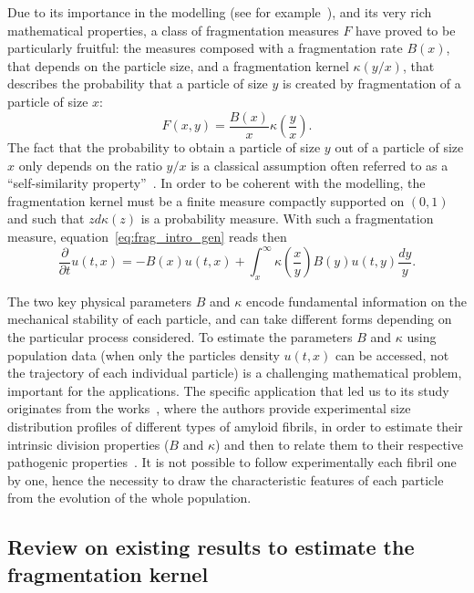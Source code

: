 \documentclass[AHL,Unicode,longabstracts,published]{cedram}
\newcommand*\dst{\displaystyle}
\newcommand*\p{\partial}
\newcommand*\f{\frac}
\begin{document}
Due to its importance in the modelling (see for example~\cite{Ram74,Val}), and its very rich mathematical properties, a class of fragmentation measures $F$ have proved to be particularly fruitful:
the measures composed with a fragmentation rate $B(x)$, that depends on the particle size, and a fragmentation kernel $\kappa (y/x)$, that describes the probability that a particle of size $y$ is created by fragmentation of a particle of size $x$:
\begin{equation}\label{eq:frag_intro_simF}
F(x, y)= \frac {B(x)} {x}\kappa\left(\frac {y} {x} \right).
\end{equation}
The fact that the probability to obtain a particle of size $y$ out of a particle of size $x$ only depends on the ratio $y/x$ is a classical assumption often referred to as a ``self-similarity property''~\cite{Bertoin1,BW,CCM}. In order to be coherent with the modelling, the fragmentation kernel must be a finite measure compactly supported on $(0, 1)$ and such that $zd\kappa(z)$ is a probability measure. With such a fragmentation measure, equation~\eqref{eq:frag_intro_gen} reads then
\begin{equation}\label{eq:frag_intro}
\dfrac{\p}{\p t}u(t,x) =- B(x)u(t,x) + \dst\int_{x}^{\infty}\kappa\left(\dfrac{x}{y} \right)B(y) u(t,y)\f{dy}{y}.
\end{equation}



The two key physical parameters $B$ and $\kappa$ encode fundamental information on the mechanical stability of each particle, and can take different forms depending on the particular process considered.
To estimate the parameters $B$ and $\kappa$ using population data (when only the particles density $u(t,x)$ can be accessed, not the trajectory of each individual particle) is a challenging mathematical  problem, important for the applications. The specific application that led us to its study originates from the works~\cite{XHR09,XR13}, where the authors provide experimental size distribution profiles of different types of amyloid fibrils, in order to estimate their intrinsic division properties ($B$ and $\kappa$) and then to relate them to their respective pathogenic properties~\cite{BTMPSTDX19}. It is not possible to follow experimentally each fibril one by one, hence the necessity to draw the characteristic features of each particle from the evolution of the whole population.


\subsection{Review on existing results to estimate the fragmentation kernel} \label{sec:review}
\end{document}
